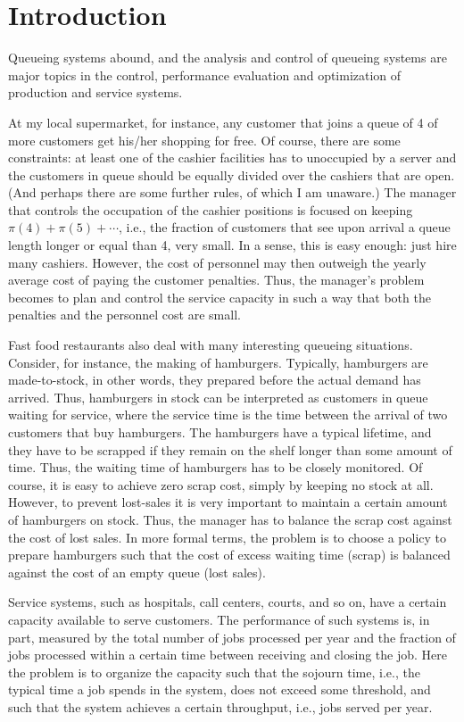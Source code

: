 \chapter{Introduction}\label{sec:introduction}

Queueing systems abound, and the analysis and control of queueing
systems are major topics in the control, performance evaluation and
optimization of production and service systems. 

At my local supermarket, for instance, any customer that joins a queue
of 4 of more customers get his/her shopping for free. Of course, there
are some constraints: at least one of the cashier facilities has to
unoccupied by a server and the customers in queue should be equally
divided over the cashiers that are open. (And perhaps there are some
further rules, of which I am unaware.) The manager that controls the
occupation of the cashier positions is focused on keeping
$\pi(4)+\pi(5)+\cdots$, i.e., the fraction of customers that see upon
arrival a queue length longer or equal than 4, very small. In a sense,
this is easy enough: just hire many cashiers. However, the cost of
personnel may then outweigh the yearly average cost of paying the
customer penalties. Thus, the manager's problem becomes to plan and
control the service capacity  in such a way that both
the penalties and the personnel cost are small.

Fast food restaurants also deal with many interesting queueing
situations. Consider, for instance, the making of
hamburgers. Typically, hamburgers are made-to-stock, in other words,
they prepared before the actual demand has arrived. Thus, hamburgers
in stock can be interpreted as customers in queue waiting for service,
where the service time is the time between the arrival of two
customers that buy hamburgers. The hamburgers have a typical lifetime,
and they have to be scrapped if they remain on the shelf longer than
some amount of time. Thus, the waiting time of hamburgers has to be
closely monitored. Of course, it is easy to achieve zero scrap cost,
simply by keeping no stock at all.  However, to prevent lost-sales it
is very important to maintain a certain amount of hamburgers on
stock. Thus, the manager has to balance the scrap cost against the
cost of lost sales. In more formal terms, the problem is to choose a
policy to prepare hamburgers such that the cost of excess waiting time
(scrap) is balanced against the cost of an empty queue (lost sales).

Service systems, such as hospitals, call centers, courts, and so on,
have a certain capacity available to serve customers. The performance
of such systems is, in part, measured by the total number of jobs
processed per year and the fraction of jobs processed within a certain
time between receiving and closing the job. Here the problem is to
organize the capacity such that the sojourn time, i.e., the typical
time a job spends in the system, does not exceed some threshold, and
such that the system achieves a certain throughput, i.e., jobs served
per year. 

